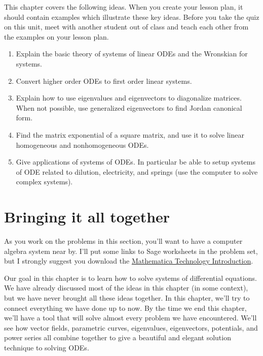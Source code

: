 
This chapter covers the following ideas. When you create your lesson plan, it should contain examples which illustrate these key ideas. Before you take the quiz on this unit, meet with another student out of class and teach each other from the examples on your lesson plan. 


\begin{enumerate}
\item Explain the basic theory of systems of linear ODEs and the Wronskian for systems.
\item Convert higher order ODEs to first order linear systems.
\item Explain how to use eigenvalues and eigenvectors to diagonalize matrices. When not possible, use generalized eigenvectors to find Jordan canonical form.
\item Find the matrix exponential of a square matrix, and use it to solve linear homogeneous and nonhomogeneous ODEs. 
\item Give applications of systems of ODEs. In particular be able to setup systems of ODE related to dilution, electricity, and springs (use the computer to solve complex systems). 
\end{enumerate}



\section{Bringing it all together}
As you work on the problems in this section, you'll want to have a computer algebra system near by.  I'll put some links to Sage worksheets in the problem set, but I strongly suggest you download the \href{\urlmathematicatechintro}{Mathematica Technology Introduction}.

Our goal in this chapter is to learn how to solve systems of differential equations.  We have already discussed most of the ideas in this chapter (in some context), but we have never brought all these ideas together.  In this chapter, we'll try to connect everything we have done up to now. By the time we end this chapter, we'll have a tool that will solve almost every problem we have encountered. We'll see how vector fields, parametric curves, eigenvalues, eigenvectors, potentials, and power series all combine together to give a beautiful and elegant solution technique to solving ODEs.

